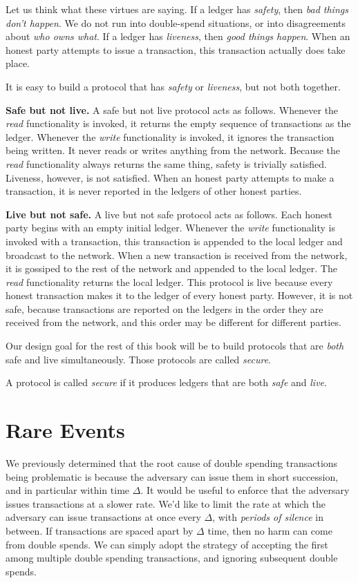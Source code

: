 Let us think what these virtues are saying. If a ledger has \emph{safety},
then \emph{bad things don't happen}. We do not run into double-spend situations,
or into disagreements about \emph{who owns what}. If a ledger has \emph{liveness},
then \emph{good things happen}. When an honest party attempts to issue a transaction,
this transaction actually does take place.

It is easy to build a protocol that has \emph{safety} or \emph{liveness}, but not
both together.

\noindent
\textbf{Safe but not live.} A safe but not live protocol acts as follows.
Whenever the \emph{read} functionality is invoked, it returns the empty sequence of
transactions as the ledger. Whenever the \emph{write} functionality is invoked, it
ignores the transaction being written. It never reads or writes anything from the
network. Because the \emph{read} functionality always returns the same thing,
safety is trivially satisfied. Liveness, however, is not satisfied. When an honest
party attempts to make a transaction, it is never reported in the ledgers of other
honest parties.

\noindent
\textbf{Live but not safe.} A live but not safe protocol acts as follows.
Each honest party begins with an empty initial ledger. Whenever the \emph{write}
functionality is invoked with a transaction, this transaction is appended to the
local ledger and broadcast to the network. When a new transaction is received from the
network, it is gossiped to the rest of the network and appended to the local ledger.
The \emph{read} functionality returns the local ledger. This protocol is live
because every honest transaction makes it to the ledger of every honest party.
However, it is not safe, because transactions are reported on the ledgers in the
order they are received from the network, and this order may be different for
different parties.

Our design goal for the rest of this book will be to build protocols that
are \emph{both} safe and live simultaneously. Those protocols are called
\emph{secure}.

\begin{definition}[Security]
    A protocol is called \emph{secure} if it produces ledgers that are both
    \emph{safe} and \emph{live}.
\end{definition}

\section{Rare Events}
We previously determined that the root cause of double spending transactions being problematic
is because the adversary can issue them in short succession, and in particular within time
$\Delta$. It would be useful to enforce that the adversary issues transactions at a slower
rate. We'd like to limit the rate at which the adversary can issue transactions at
once every $\Delta$, with \emph{periods of silence} in between. If transactions are
spaced apart by $\Delta$ time, then no harm can come from double spends. We can simply
adopt the strategy of accepting the first among multiple double spending transactions,
and ignoring subsequent double spends.

